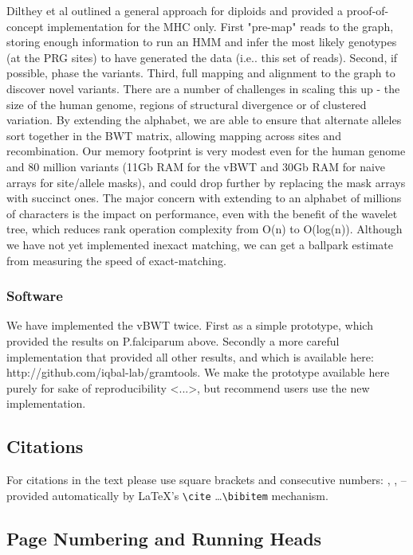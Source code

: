 \documentclass[runningheads,a4paper]{llncs}
\begin{document}
Dilthey et al outlined a general approach for diploids and provided a  proof-of-concept implementation for the MHC only. First "pre-map" reads to the graph, storing enough information to run an HMM and infer the most likely genotypes (at the PRG sites) to have generated the data (i.e.. this set of reads). Second, if possible, phase the variants. Third, full mapping and alignment to the graph to discover novel variants. There are a number of challenges in scaling this up - the size of the human genome, regions of structural divergence or of clustered variation. By extending the alphabet, we are able to ensure that alternate alleles sort together in the BWT matrix, allowing mapping across sites and recombination. Our memory footprint is very modest even for the human genome and 80 million variants (11Gb RAM for the vBWT and 30Gb RAM for naive arrays for site/allele masks), and could drop further by replacing the mask  arrays with succinct ones. The major concern with extending to an alphabet of millions of characters is the impact on performance,  even with the benefit of the wavelet tree, which reduces rank operation complexity from O(n) to O(log(n)). Although we have not yet implemented inexact matching, we can get a ballpark estimate from measuring the speed of exact-matching.

\subsubsection{Software}
We have implemented the vBWT twice. First as a simple prototype, which provided the results on P.falciparum above. Secondly  a more careful implementation that provided all other results, and which is available here: http://github.com/iqbal-lab/gramtools. We make the prototype available here purely for sake of reproducibility <...>, but recommend users use the new implementation.




\subsection{Citations}

For citations in the text please use
square brackets and consecutive numbers: \cite{jour}, \cite{lncschap},
\cite{proceeding1} -- provided automatically
by \LaTeX 's \verb|\cite| \dots\verb|\bibitem| mechanism.

\subsection{Page Numbering and Running Heads}
\end{document}
